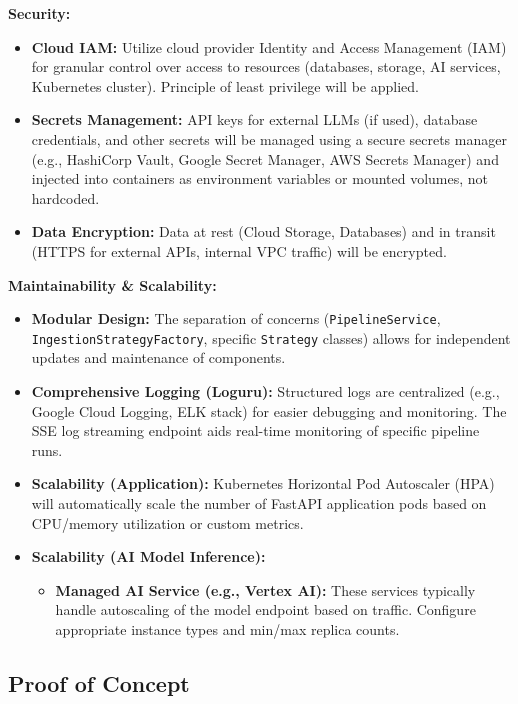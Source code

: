 \textbf{Security:}
\begin{itemize}
    \item \textbf{Cloud IAM:} Utilize cloud provider Identity and Access Management (IAM) for granular control over access to resources (databases, storage, AI services, Kubernetes cluster). Principle of least privilege will be applied.
    \item \textbf{Secrets Management:} API keys for external LLMs (if used), database credentials, and other secrets will be managed using a secure secrets manager (e.g., HashiCorp Vault, Google Secret Manager, AWS Secrets Manager) and injected into containers as environment variables or mounted volumes, not hardcoded.
    \item \textbf{Data Encryption:} Data at rest (Cloud Storage, Databases) and in transit (HTTPS for external APIs, internal VPC traffic) will be encrypted.
\end{itemize}

\textbf{Maintainability \& Scalability:}
\begin{itemize}
    \item \textbf{Modular Design:} The separation of concerns (\texttt{PipelineService}, \texttt{IngestionStrategyFactory}, specific \texttt{Strategy} classes) allows for independent updates and maintenance of components.
    \item \textbf{Comprehensive Logging (Loguru):} Structured logs are centralized (e.g., Google Cloud Logging, ELK stack) for easier debugging and monitoring. The SSE log streaming endpoint aids real-time monitoring of specific pipeline runs.
    \item \textbf{Scalability (Application):} Kubernetes Horizontal Pod Autoscaler (HPA) will automatically scale the number of FastAPI application pods based on CPU/memory utilization or custom metrics.
    \item \textbf{Scalability (AI Model Inference):}
        \begin{itemize}
            \item \textbf{Managed AI Service (e.g., Vertex AI):} These services typically handle autoscaling of the model endpoint based on traffic. Configure appropriate instance types and min/max replica counts.
        \end{itemize}
\end{itemize}

\subsection{Proof of Concept}
\label{ssec:poc}

